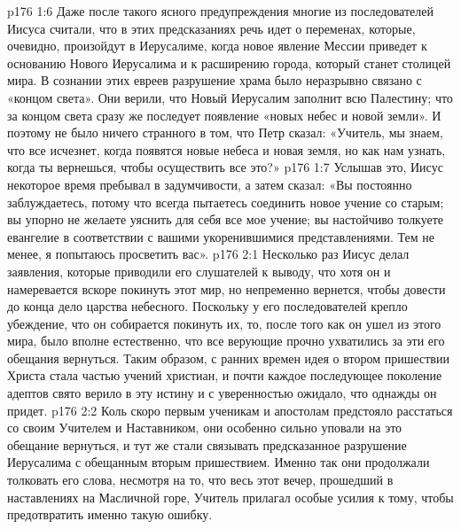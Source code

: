 \vs p176 1:6 Даже после такого ясного предупреждения многие из последователей Иисуса считали, что в этих предсказаниях речь идет о переменах, которые, очевидно, произойдут в Иерусалиме, когда новое явление Мессии приведет к основанию Нового Иерусалима и к расширению города, который станет столицей мира. В сознании этих евреев разрушение храма было неразрывно связано с «концом света». Они верили, что Новый Иерусалим заполнит всю Палестину; что за концом света сразу же последует появление «новых небес и новой земли». И поэтому не было ничего странного в том, что Петр сказал: «Учитель, мы знаем, что все исчезнет, когда появятся новые небеса и новая земля, но как нам узнать, когда ты вернешься, чтобы осуществить все это?»
\vs p176 1:7 Услышав это, Иисус некоторое время пребывал в задумчивости, а затем сказал: «Вы постоянно заблуждаетесь, потому что всегда пытаетесь соединить новое учение со старым; вы упорно не желаете уяснить для себя все мое учение; вы настойчиво толкуете евангелие в соответствии с вашими укоренившимися представлениями. Тем не менее, я попытаюсь просветить вас».
\vs p176 2:1 Несколько раз Иисус делал заявления, которые приводили его слушателей к выводу, что хотя он и намеревается вскоре покинуть этот мир, но непременно вернется, чтобы довести до конца дело царства небесного. Поскольку у его последователей крепло убеждение, что он собирается покинуть их, то, после того как он ушел из этого мира, было вполне естественно, что все верующие прочно ухватились за эти его обещания вернуться. Таким образом, с ранних времен идея о втором пришествии Христа стала частью учений христиан, и почти каждое последующее поколение адептов свято верило в эту истину и с уверенностью ожидало, что однажды он придет.
\vs p176 2:2 Коль скоро первым ученикам и апостолам предстояло расстаться со своим Учителем и Наставником, они особенно сильно уповали на это обещание вернуться, и тут же стали связывать предсказанное разрушение Иерусалима с обещанным вторым пришествием. Именно так они продолжали толковать его слова, несмотря на то, что весь этот вечер, прошедший в наставлениях на Масличной горе, Учитель прилагал особые усилия к тому, чтобы предотвратить именно такую ошибку.
